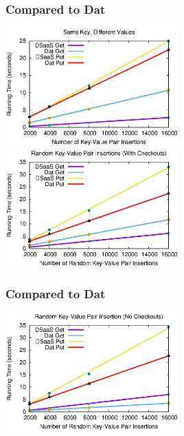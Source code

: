\begin{frame}[fragile]
	\frametitle{Compared to Dat}
  \begin{center}
  	\includegraphics[width=0.5\textwidth]{images/same_key_diff_versions.eps}
  	\includegraphics[width=0.5\textwidth]{images/kvpair.eps}
  \end{center}
\end{frame}

\begin{frame}[fragile]
  \frametitle{Compared to Dat}
  \begin{center}
  	\includegraphics[width=0.5\textwidth]{images/samver.eps}
  \end{center}
\end{frame}